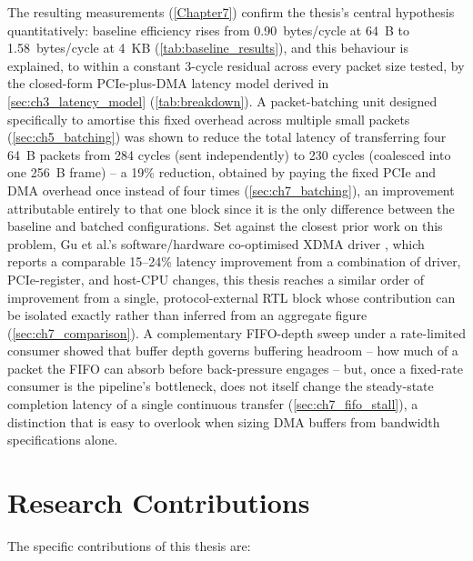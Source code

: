 The resulting measurements (\autoref{Chapter7}) confirm the thesis's central hypothesis quantitatively: baseline efficiency rises from 0.90~bytes/cycle at 64~B to 1.58~bytes/cycle at 4~KB (\autoref{tab:baseline_results}), and this behaviour is explained, to within a constant 3-cycle residual across every packet size tested, by the closed-form PCIe-plus-DMA latency model derived in \autoref{sec:ch3_latency_model} (\autoref{tab:breakdown}). A packet-batching unit designed specifically to amortise this fixed overhead across multiple small packets (\autoref{sec:ch5_batching}) was shown to reduce the total latency of transferring four 64~B packets from 284 cycles (sent independently) to 230 cycles (coalesced into one 256~B frame) -- a 19\% reduction, obtained by paying the fixed PCIe and DMA overhead once instead of four times (\autoref{sec:ch7_batching}), an improvement attributable entirely to that one block since it is the only difference between the baseline and batched configurations. Set against the closest prior work on this problem, Gu et al.'s software/hardware co-optimised XDMA driver \cite{gu2025cooptimization}, which reports a comparable 15--24\% latency improvement from a combination of driver, PCIe-register, and host-CPU changes, this thesis reaches a similar order of improvement from a single, protocol-external RTL block whose contribution can be isolated exactly rather than inferred from an aggregate figure (\autoref{sec:ch7_comparison}). A complementary FIFO-depth sweep under a rate-limited consumer showed that buffer depth governs buffering headroom -- how much of a packet the FIFO can absorb before back-pressure engages -- but, once a fixed-rate consumer is the pipeline's bottleneck, does not itself change the steady-state completion latency of a single continuous transfer (\autoref{sec:ch7_fifo_stall}), a distinction that is easy to overlook when sizing DMA buffers from bandwidth specifications alone.

\section{Research Contributions}
\label{sec:ch8_contributions}

The specific contributions of this thesis are:

